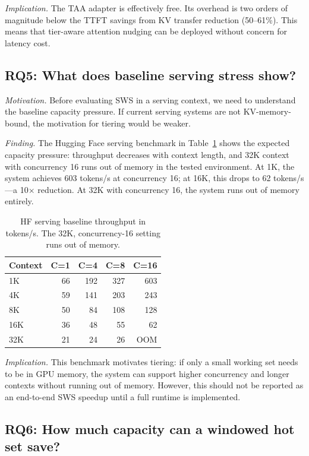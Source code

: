 \documentclass[11pt]{article}
\newcommand{\method}{SWS}
\newcommand{\taa}{TAA}
\newcommand{\pct}{\%}
\theoremstyle{definition}
\theoremstyle{plain}
\begin{document}
\emph{Implication.}  The \taa{} adapter is effectively free.  Its overhead is two orders of magnitude below the TTFT savings from KV transfer reduction (50--61\pct{}).  This means that tier-aware attention nudging can be deployed without concern for latency cost.

\subsection{RQ5: What does baseline serving stress show?}
\label{sec:rq5}

\emph{Motivation.}  Before evaluating \method{} in a serving context, we need to understand the baseline capacity pressure.  If current serving systems are not KV-memory-bound, the motivation for tiering would be weaker.

\emph{Finding.}  The Hugging Face serving benchmark in Table~\ref{tab:hf-serving} shows the expected capacity pressure: throughput decreases with context length, and 32K context with concurrency 16 runs out of memory in the tested environment.  At 1K, the system achieves 603 tokens/s at concurrency 16; at 16K, this drops to 62 tokens/s---a 10$\times$ reduction.  At 32K with concurrency 16, the system runs out of memory entirely.

\begin{table}[t]
\centering
\caption{HF serving baseline throughput in tokens/s.  The 32K, concurrency-16 setting runs out of memory.}
\label{tab:hf-serving}
\small
\begin{tabular}{lrrrr}
\toprule
Context & C=1 & C=4 & C=8 & C=16 \\
\midrule
1K & 66 & 192 & 327 & 603 \\
4K & 59 & 141 & 203 & 243 \\
8K & 50 & 84 & 108 & 128 \\
16K & 36 & 48 & 55 & 62 \\
32K & 21 & 24 & 26 & OOM \\
\bottomrule
\end{tabular}
\end{table}

\emph{Implication.}  This benchmark motivates tiering: if only a small working set needs to be in GPU memory, the system can support higher concurrency and longer contexts without running out of memory.  However, this should not be reported as an end-to-end \method{} speedup until a full runtime is implemented.

\subsection{RQ6: How much capacity can a windowed hot set save?}
\label{sec:rq6}
\end{document}
